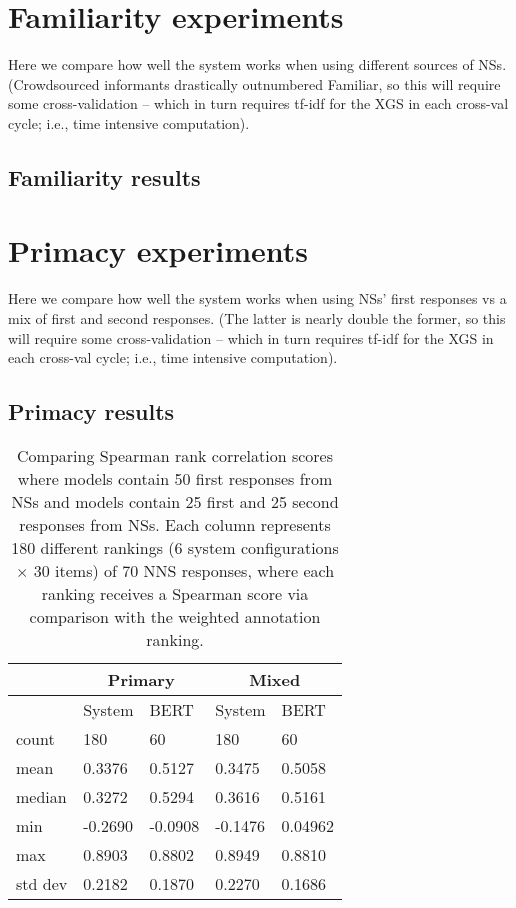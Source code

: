 \section{Familiarity experiments}
\label{sec:exp-familiarity}
Here we compare how well the system works when using different sources of NSs. (Crowdsourced informants drastically outnumbered Familiar, so this will require some cross-validation -- which in turn requires tf-idf for the XGS in each cross-val cycle; i.e., time intensive computation).
\subsection{Familiarity results}
\label{sec:familiarity-results}

\section{Primacy experiments}
\label{sec:exp-primacy}
Here we compare how well the system works when using NSs' first responses vs a mix of first and second responses. (The latter is nearly double the former, so this will require some cross-validation -- which in turn requires tf-idf for the XGS in each cross-val cycle; i.e., time intensive computation).
\subsection{Primacy results}
\label{sec:primacy-results}

\begin{table}[htb!]
\begin{center}
\begin{tabular}{|l||l|l||l|l|}
\hline
 & \multicolumn{2}{c||}{Primary} & \multicolumn{2}{c|}{Mixed} \\
\hline
& System & BERT & System & BERT \\
\hline
\hline
count & 180 & 60 & 180 & 60 \\
\hline
mean & 0.3376 & 0.5127 & 0.3475 & 0.5058 \\
\hline
median & 0.3272 & 0.5294 & 0.3616 & 0.5161  \\
\hline
min & -0.2690 & -0.0908 & -0.1476 & 0.04962  \\
\hline
max & 0.8903 & 0.8802 & 0.8949 & 0.8810 \\
\hline
std dev & 0.2182 & 0.1870 & 0.2270 & 0.1686 \\
\hline
\end{tabular}
\caption{\label{tab:primacy-results} Comparing Spearman rank correlation scores where  models contain 50 first responses from NSs and  models contain 25 first and 25 second responses from NSs. Each column represents 180 different rankings (6 system configurations $\times$ 30 items) of 70 NNS responses, where each ranking receives a Spearman score via comparison with the weighted annotation ranking.}
\end{center}
\end{table}

